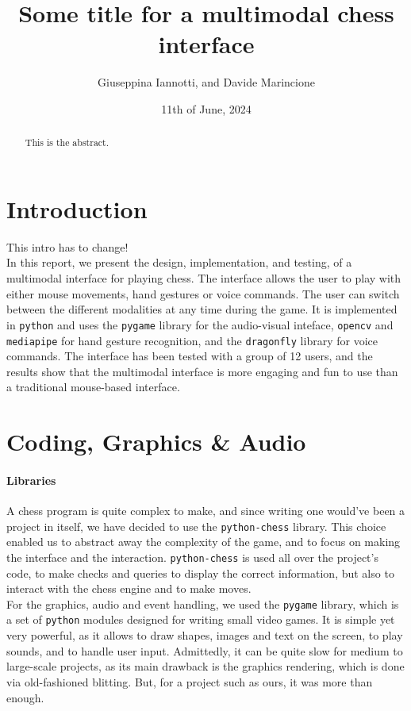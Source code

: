 \documentclass[a4paper, 11pt, twocolumn]{IEEEtran}
\title{Some title for a multimodal chess interface}
\author{Giuseppina Iannotti, and Davide Marincione}
\date{11th of June, 2024}
\begin{document}
    \maketitle
    \begin{abstract}
        This is the abstract.
    \end{abstract}

    \section{Introduction}

    {\Huge This intro has to change!}\\
    In this report, we present the design, implementation, and testing, of a multimodal interface for playing chess. The interface allows the user to play with either mouse movements, hand gestures or voice commands. The user can switch between the different modalities at any time during the game. It is implemented in \texttt{python} and uses the \texttt{pygame} library for the audio-visual inteface, \texttt{opencv} and \texttt{mediapipe} for hand gesture recognition, and the \texttt{dragonfly} library for voice commands. The interface has been tested with a group of 12 users, and the results show that the multimodal interface is more engaging and fun to use than a traditional mouse-based interface.

    \section{Coding, Graphics \& Audio}
    \paragraph*{Libraries} A chess program is quite complex to make, and since writing one would've been a project in itself, we have decided to use the \texttt{python-chess} library. This choice enabled us to abstract away the complexity of the game, and to focus on making the interface and the interaction. \texttt{python-chess} is used all over the project's code, to make checks and queries to display the correct information, but also to interact with the chess engine and to make moves.\\For the graphics, audio and event handling, we used the \texttt{pygame} library, which is a set of \texttt{python} modules designed for writing small video games. It is simple yet very powerful, as it allows to draw shapes, images and text on the screen, to play sounds, and to handle user input. Admittedly, it can be quite slow for medium to large-scale projects, as its main drawback is the graphics rendering, which is done via old-fashioned blitting. But, for a project such as ours, it was more than enough.
\end{document}
